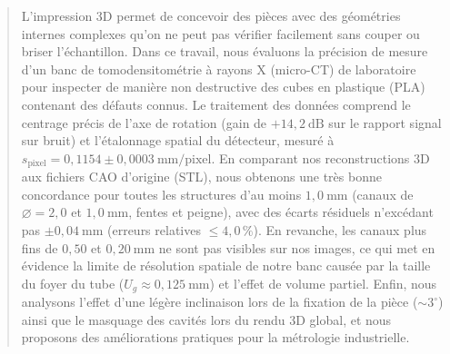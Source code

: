 \documentclass[11pt,letterpaper]{article}
\begin{document}
\begin{abstract}
\noindent L'impression 3D permet de concevoir des pièces avec des géométries internes complexes qu'on ne peut pas vérifier facilement sans couper ou briser l'échantillon. Dans ce travail, nous évaluons la précision de mesure d'un banc de tomodensitométrie à rayons X (micro-CT) de laboratoire pour inspecter de manière non destructive des cubes en plastique (PLA) contenant des défauts connus. Le traitement des données comprend le centrage précis de l'axe de rotation (gain de $+14{,}2~\text{dB}$ sur le rapport signal sur bruit) et l'étalonnage spatial du détecteur, mesuré à $s_{\text{pixel}} = 0{,}1154 \pm 0{,}0003~\text{mm/pixel}$. En comparant nos reconstructions 3D aux fichiers CAO d'origine (STL), nous obtenons une très bonne concordance pour toutes les structures d'au moins $1{,}0~\text{mm}$ (canaux de $\varnothing = 2{,}0$ et $1{,}0~\text{mm}$, fentes et peigne), avec des écarts résiduels n'excédant pas $\pm 0{,}04~\text{mm}$ (erreurs relatives $\le 4{,}0\,\%$). En revanche, les canaux plus fins de $0{,}50$ et $0{,}20~\text{mm}$ ne sont pas visibles sur nos images, ce qui met en évidence la limite de résolution spatiale de notre banc causée par la taille du foyer du tube ($U_g \approx 0{,}125~\text{mm}$) et l'effet de volume partiel. Enfin, nous analysons l'effet d'une légère inclinaison lors de la fixation de la pièce ($\sim 3^\circ$) ainsi que le masquage des cavités lors du rendu 3D global, et nous proposons des améliorations pratiques pour la métrologie industrielle.
\end{abstract}

\vspace{0.4cm}










\end{document}
